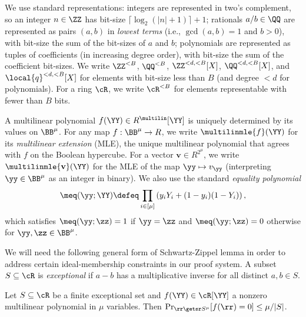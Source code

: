\label{sec:bitstring-rep}
We use standard representations: integers are represented in two's complement, so an integer $n\in\ZZ$ has bit-size $\lceil\log_2(|n|+1)\rceil + 1$; rationals $a/b\in\QQ$ are represented as pairs $(a,b)$ in \emph{lowest terms} (i.e., $\gcd(a,b)=1$ and $b>0$), with bit-size the sum of the bit-sizes of $a$ and $b$; polynomials are represented as tuples of coefficients (in increasing degree order), with bit-size the sum of the coefficient bit-sizes.
We write $\ZZ^{<B}$, $\QQ^{<B}$, $\ZZ^{<d,<B}[X]$, $\QQ^{<d,<B}[X]$, and $\local{q}^{<d,<B}[X]$ for elements with bit-size less than $B$ (and degree $<d$ for polynomials).
For a ring $\cR$, we write $\cR^{<B}$ for elements representable with fewer than $B$ bits.


\label{sec:multilinear-extensions}
A multilinear polynomial $f(\YY)\in R^{\multilin}[\YY]$ is uniquely determined by its values on $\BB^\mu$. For any map $f: \BB^\mu \to R$, we write $\multilinmle{f}(\YY)$ for its \emph{multilinear extension} (MLE), the unique multilinear polynomial that agrees with $f$ on the Boolean hypercube. 
For a vector $\mathbf{v}\in R^{2^\mu}$, we write $\multilinmle{\mathbf{v}}(\YY)$ for the MLE of the map $\yy\mapsto v_\yy$ (interpreting $\yy\in\BB^\mu$ as an integer in binary).
We also use the standard \emph{equality polynomial}
\begin{equation}\label{e: MLE}
\meq(\yy; \YY) \defeq \prod_{i\in [\mu]} \left(y_i Y_i + (1-y_i)(1-Y_i)\right),
\end{equation}
which satisfies $\meq(\yy;\zz)=1$ if $\yy=\zz$ and $\meq(\yy;\zz)=0$ otherwise for $\yy,\zz\in\BB^\mu$. 


\label{sec:algebraic-tools}
We will need the following general form of Schwartz-Zippel lemma in order to address certain ideal-membership constraints in our proof system. A subset $S\subseteq \cR$ is \emph{exceptional} if $a-b$ has a multiplicative inverse for all distinct $a,b\in S$.
\begin{lemma}
\label{lem:sz_exceptional_sets} 
Let $S\subseteq\cR$ be a finite exceptional set and $f(\YY)\in \cR[\YY]$ a nonzero multilinear polynomial in $\mu$ variables. Then
$\Pr_{\rr\getsr S^\mu}[f(\rr)=0] \le \mu/|S|$.
\end{lemma}



